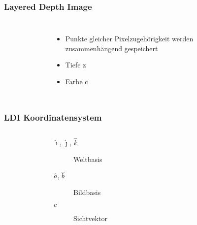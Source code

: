 \documentclass[aspectratio=169]{beamer}
\begin{document}
\begin{frame}
    \frametitle{Layered Depth Image}
    \begin{columns}
        \begin{figure}
            \centering
            \resizebox{\linewidth}{!}{}%
            \label{fig:layereddepthimage}
        \end{figure}

    \begin{itemize}
        \item Punkte gleicher Pixelzugehörigkeit werden zusammenhängend gespeichert
        \item Tiefe z
        \item Farbe c
    \end{itemize}
    \end{columns}
\end{frame}

\begin{frame}
    \frametitle{LDI Koordinatensystem}
    \begin{columns}
        \begin{figure}
            \centering
            \resizebox{\linewidth}{!}{}%
            \label{fig:ldicoord}
        \end{figure}
    
    \begin{description}
        \item[\(\hat{\imath}\), \( \hat{\jmath} \), \( \hat{k} \)] Weltbasis
        \item[\( \hat{a} \), \( \hat{b} \)] Bildbasis
        \item[\( c \)] Sichtvektor
    \end{description}
    \end{columns}
\end{frame}
\end{document}

